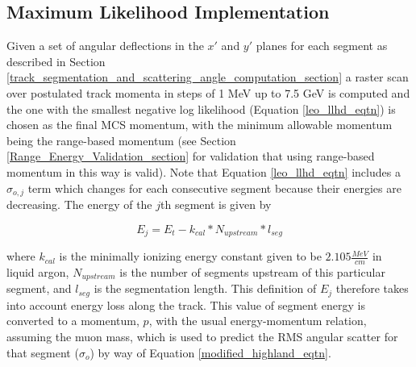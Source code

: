 \documentclass[a4paper,11pt]{article}
\begin{document}
\subsection{Maximum Likelihood Implementation}\label{maximum_likelihood_section}

Given a set of angular deflections in the $x'$ and $y'$ planes for each segment as described in Section \ref{track_segmentation_and_scattering_angle_computation_section} a raster scan over postulated track momenta in steps of 1 MeV up to 7.5 GeV is computed and the one with the smallest negative log likelihood (Equation \ref{leo_llhd_eqtn}) is chosen as the final MCS momentum, with the minimum allowable momentum being the range-based momentum (see Section \ref{Range_Energy_Validation_section} for validation that using range-based momentum in this way is valid). Note that Equation \ref{leo_llhd_eqtn} includes a $\sigma_{o,j}$ term which changes for each consecutive segment because their energies are decreasing. The energy of the $j$th segment is given by

\begin{equation}\label{segment_E_equation}
E_{j} = E_t - k_{cal}*N_{upstream}*l_{seg}
\end{equation}

where $k_{cal}$ is the minimally ionizing energy constant given to be $2.105 \frac{MeV}{cm}$ in liquid argon\cite{MIPenergysource}, $N_{upstream}$ is the number of segments upstream of this particular segment, and $l_{seg}$ is the segmentation length. This definition of $E_j$ therefore takes into account energy loss along the track. This value of segment energy is converted to a momentum, $p$, with the usual energy-momentum relation, assuming the muon mass, which is used to predict the RMS angular scatter for that segment ($\sigma_o$) by way of Equation \ref{modified_highland_eqtn}.
















\end{document}
